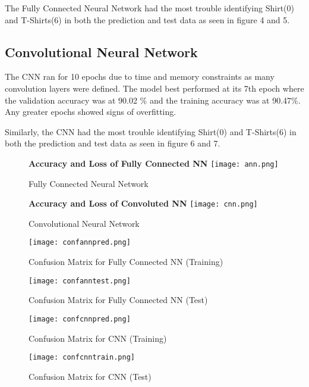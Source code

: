 \documentclass[a4paper,12pt]{article}
\begin{document}
The Fully Connected Neural Network had the most trouble identifying Shirt(0) and T-Shirts(6) in both the prediction and test data as seen in figure 4 and 5.
\subsection{Convolutional Neural Network}
The CNN ran for 10 epochs due to time and memory constraints as many convolution layers were defined. The model best performed at its 7th epoch where the validation accuracy was at 90.02 \% and the training accuracy was at 90.47\%. Any greater epochs showed signs of overfitting.

Similarly, the CNN had the most trouble identifying Shirt(0) and T-Shirts(6) in both the prediction and test data as seen in figure 6 and 7.
 
\begin{figure}[h]
	
	\begin{minipage}[t]{6 cm}
		\centering
		\textbf{Accuracy and Loss of Fully Connected NN} 
		\texttt{[image: ann.png]}
		\caption{Fully Connected Neural Network }
	\end{minipage}
	\hspace{2cm}
	\begin{minipage}[t]{6 cm}
		\centering
		\textbf{Accuracy and Loss of Convoluted NN} 
		\texttt{[image: cnn.png]}
		\caption{Convolutional Neural Network}
	\end{minipage}
\end{figure}
\begin{figure}[h]
	
	\begin{minipage}[t]{7cm}
		\centering
		\texttt{[image: confannpred.png]}
		\caption{Confusion Matrix for Fully Connected NN (Training)}
	\end{minipage}
	\hspace{1cm}
	\begin{minipage}[t]{7cm}
		\centering
		\texttt{[image: confanntest.png]}
		\caption{Confusion Matrix for Fully Connected NN (Test)}
	\end{minipage}
\end{figure}
\begin{figure}[!h]
	
	\begin{minipage}[t]{7cm}
		\centering
		\texttt{[image: confcnnpred.png]}
		\caption{Confusion Matrix for CNN (Training)}
	\end{minipage}
	\hspace{1cm}
	\begin{minipage}[t]{7cm}
		\centering
		\texttt{[image: confcnntrain.png]}
		\caption{Confusion Matrix for CNN (Test)}
	\end{minipage}
\end{figure}
\end{document}
